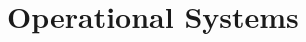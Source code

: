 \documentclass[\main/notes.tex]{subfiles}
\begin{document}
	\setcounter{chapter}{6}
	\chapter{Operational Systems}
	\vbox{}
\end{document}
